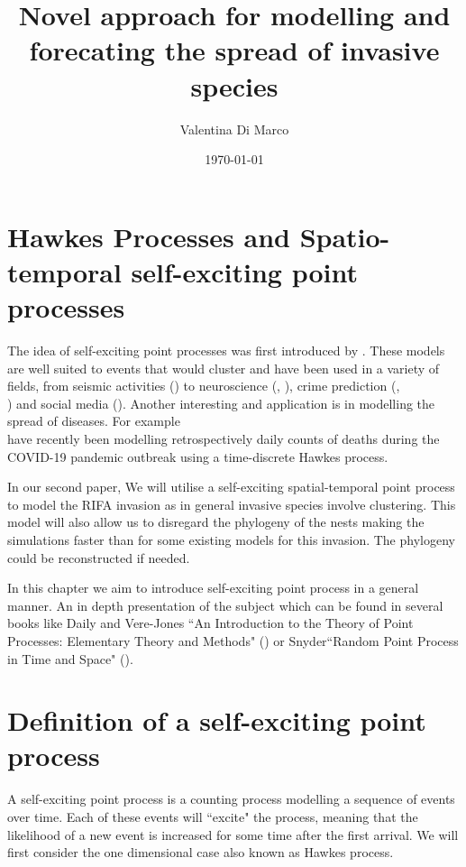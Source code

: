 \documentclass[11pt,a4paper]{article}
\title{Novel approach for modelling and forecating the spread of invasive species}
\author{Valentina Di Marco}
\date{\today}
\begin{document}
 \maketitle



\section{Hawkes Processes and Spatio-temporal self-exciting point processes}
\label{ch:Hawkes}

The idea of self-exciting point processes was first introduced by \cite{Hawkes71}. These models are well suited to events that would cluster and have been used in a variety of fields, from seismic activities (\cite{Ogata88}) to neuroscience (\cite{Reynaud}, \cite{Chornoboy}), crime prediction (\cite{Mohler13}, \cite{White} \\ \cite{Reinhart2018}) and social media (\cite{Chen}). Another interesting and application is in modelling the spread of diseases. For example \\ \cite{Browning} have recently been modelling retrospectively daily counts of deaths during the COVID-19 pandemic outbreak using a time-discrete Hawkes process. 

In our second paper, We will utilise a self-exciting spatial-temporal point process to model the RIFA invasion as in general invasive species involve clustering. This model will also allow us to disregard the phylogeny of the nests making the simulations faster than for some existing models for this invasion. The phylogeny could be reconstructed if needed.

In this chapter we aim to introduce self-exciting point process in a general manner. An in depth presentation of the subject which can be found in several books like Daily and Vere-Jones ``An Introduction to the Theory of Point Processes: Elementary Theory and Methods" (\cite{Daley}) or Snyder``Random Point Process in Time and Space" (\cite{Snyder}).

\section{Definition of a self-exciting point process}

A self-exciting point process is a counting process modelling a sequence of events over time. Each of these events will ``excite" the process, meaning that the likelihood of a new event is increased for some time after the first arrival. We will first consider the one dimensional case also known as Hawkes process.
\end{document}
